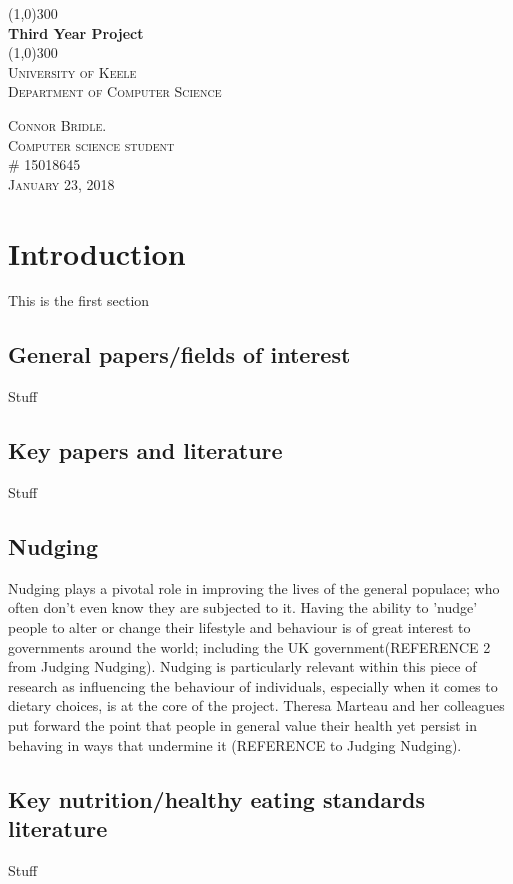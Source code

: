 \documentclass[11pt]{article}
\begin{document}
\begin{titlepage}
	\begin{center}
	\line(1,0){300} \\
	[0.25in]
	\huge{\bfseries Third Year Project} \\
	[2mm]
	\line(1,0){300} \\
	[1.5cm]
	\textsc{\LARGE University of Keele}\\
	\textsc{\Large Department of Computer Science}\\
	[10cm]
	\end{center}
	\begin{flushright}
	\textsc{\large Connor Bridle. \\
	Computer science student\\
	\# 15018645 \\
	January 23, 2018 \\}
	\end{flushright}
\end{titlepage}
\section{Introduction}
This is the first section
	\subsection{General papers/fields of interest}
	Stuff
	\subsection{Key papers and literature}
	Stuff
	\subsection{Nudging}
	Nudging plays a pivotal role in improving the lives of the general populace; who often 	don't even know they are subjected to it. Having the ability to 'nudge' people to 			alter or change their lifestyle and behaviour is of great interest to governments 			around the world; including the UK government(REFERENCE 2 from Judging Nudging). 			Nudging is particularly relevant within this piece of research as influencing the 			behaviour of individuals, especially when it comes to dietary choices, is at the core 		of the project. Theresa Marteau and her colleagues put forward the point that people in general value their health yet persist in behaving in ways that undermine it (REFERENCE to Judging Nudging).
	\subsection{Key nutrition/healthy eating standards literature}
	Stuff
\end{document}
